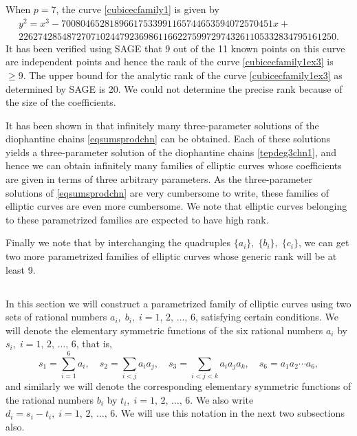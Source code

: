 \documentclass[11pt, leqno]{article}
\begin{document}
When $p=7$, the curve \eqref{cubicecfamily1} is given by
\begin{multline}
y^2=x^3-70080465281896617533991165744653594072570451x+\\
226274285487270710244792369861166227599729743261105332834795161250. \label{cubicecfamily1ex3}
\end{multline}
It has been verified using SAGE that 9 out of the 11 known points on this curve are independent points and hence the rank of the curve \eqref{cubicecfamily1ex3} is  $\geq 9$. The upper bound for the analytic rank of the curve \eqref{cubicecfamily1ex3} as determined by SAGE is 20. We could not determine the precise  rank because of the size of the coefficients. 

It has been shown in \cite{ChW} that infinitely many three-parameter solutions of the diophantine chains \eqref{eqsumsprodchn} can be obtained. Each of these solutions yields a  three-parameter solution of the diophantine chains \eqref{tepdeg3chn1}, and hence we can obtain infinitely many  families of elliptic curves whose coefficients are given in terms of three arbitrary parameters. As the three-parameter solutions of \eqref{eqsumsprodchn} are very cumbersome to write, these families of elliptic curves are even more cumbersome. We note that elliptic curves belonging to these parametrized families  are expected to have high rank. 

Finally we note that by interchanging the quadruples $\{a_i\},\;\{b_i\},\;\{c_i\}$, we can get two more parametrized families of elliptic curves whose generic rank will be at least 9.

\subsection{}
In this section we will construct a parametrized family of elliptic curves using two sets of rational numbers  $a_i,\;b_i,\;i=1,\,2,\,\ldots,\,6$, satisfying certain conditions. We will denote the elementary symmetric functions of the six rational numbers $a_i$ by $s_i,\;i=1,\,2,\,\ldots,\,6$, that is,
\begin{equation*}
s_1=\sum_{i=1}^6a_i,\quad s_2=\sum_{i<j}a_ia_j, \quad s_3=\sum_{i<j<k}a_ia_ja_k,\quad s_6=a_1a_2\cdots a_6,
\end{equation*}
and similarly we will denote the corresponding elementary symmetric functions of the rational numbers $b_i$ by $t_i,\;i=1,\,2,\,\ldots,\,6$. We  also write $d_i=s_i-t_i,\;i=1,\,2,\,\ldots,\,6$. We will use this notation  in the next two subsections also.
\end{document}
